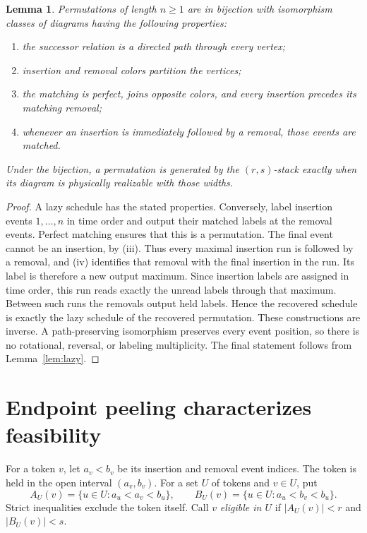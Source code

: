 \documentclass[11pt]{article}
\newtheorem{lemma}[theorem]{Lemma}
\theoremstyle{definition}\newtheorem{definition}[theorem]{Definition}
\theoremstyle{remark}\newtheorem{remark}[theorem]{Remark}
\begin{document}
\begin{lemma}\label{lem:diagram}
Permutations of length $n\ge1$ are in bijection with isomorphism classes of diagrams having the following properties:
\begin{enumerate}[label=(\roman*),nosep]
\item the successor relation is a directed path through every vertex;
\item insertion and removal colors partition the vertices;
\item the matching is perfect, joins opposite colors, and every insertion precedes its matching removal;
\item whenever an insertion is immediately followed by a removal, those events are matched.
\end{enumerate}
Under the bijection, a permutation is generated by the $(r,s)$-stack exactly when its diagram is physically realizable with those widths.
\end{lemma}
\begin{proof}
A lazy schedule has the stated properties. Conversely, label insertion events $1,\ldots,n$ in time order and output their matched labels at the removal events. Perfect matching ensures that this is a permutation. The final event cannot be an insertion, by (iii). Thus every maximal insertion run is followed by a removal, and (iv) identifies that removal with the final insertion in the run. Its label is therefore a new output maximum. Since insertion labels are assigned in time order, this run reads exactly the unread labels through that maximum. Between such runs the removals output held labels. Hence the recovered schedule is exactly the lazy schedule of the recovered permutation. These constructions are inverse. A path-preserving isomorphism preserves every event position, so there is no rotational, reversal, or labeling multiplicity. The final statement follows from Lemma~\ref{lem:lazy}.
\end{proof}

\section{Endpoint peeling characterizes feasibility}\label{sec:peeling}
For a token $v$, let $a_v<b_v$ be its insertion and removal event indices. The token is held in the open interval $(a_v,b_v)$. For a set $U$ of tokens and $v\in U$, put
\[
 A_U(v)=\{u\in U:a_u<a_v<b_u\},\qquad
 B_U(v)=\{u\in U:a_u<b_v<b_u\}.
\]
Strict inequalities exclude the token itself. Call $v$ \emph{eligible in $U$} if $|A_U(v)|<r$ and $|B_U(v)|<s$.
\end{document}
